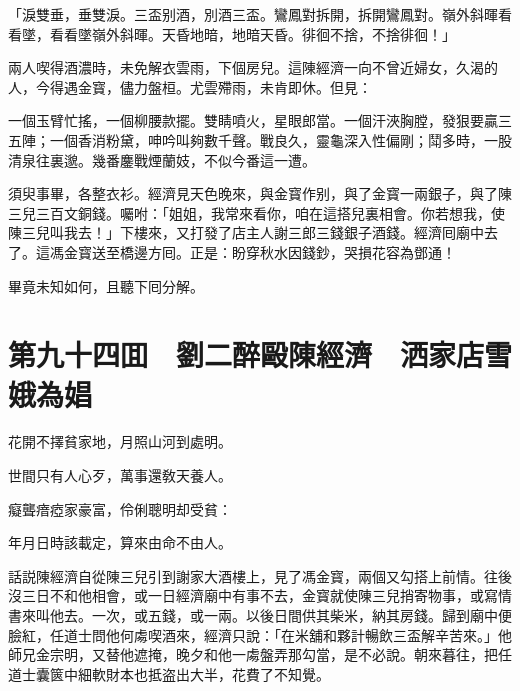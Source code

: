 「淚雙垂，垂雙淚。三盃别酒，別酒三盃。鸞鳳對拆開，拆開鸞鳳對。嶺外斜暉看看墜，看看墜嶺外斜暉。天昏地暗，地暗天昏。徘徊不捨，不捨徘徊！」

兩人喫得酒濃時，未免解衣雲雨，下個房兒。這陳經濟一向不曾近婦女，久渴的人，今得遇金寳，儘力盤桓。尤雲殢雨，未肯即休。但見：

一個玉臂忙搖，一個柳腰款擺。雙睛噴火，星眼郎當。一個汗浹胸膛，發狠要贏三五陣；一個香消粉黛，呻吟叫夠數千聲。戰良久，靈龜深入性偏剛；鬦多時，一股清泉往裏邈。幾番鏖戰煙蘭妓，不似今番這一遭。

須臾事畢，各整衣衫。經濟見天色晚來，與金寳作别，與了金寳一兩銀子，與了陳三兒三百文銅錢。囑咐：「姐姐，我常來看你，咱在這搭兒裏相會。你若想我，使陳三兒叫我去！」下樓來，又打發了店主人謝三郎三錢銀子酒錢。經濟囘廟中去了。這馮金寳送至橋邊方囘。正是：盼穿秋水因錢鈔，哭損花容為鄧通！

畢竟未知如何，且聽下囘分解。

\chapter*{第九十四囬　劉二醉毆陳經濟　洒家店雪娥為娼}

花開不擇貧家地，月照山河到處明。

世間只有人心歹，萬事還敎天養人。

癡聾瘖瘂家豪富，伶俐聰明却受貧：

年月日時該載定，算來由命不由人。

話説陳經濟自從陳三兒引到謝家大酒樓上，見了馮金寳，兩個又勾搭上前情。往後沒三日不和他相會，或一日經濟廟中有事不去，金寳就使陳三兒捎寄物事，或寫情書來叫他去。一次，或五錢，或一兩。以後日間供其柴米，納其房錢。歸到廟中便臉紅，任道士問他何䖏喫酒來，經濟只說：「在米舖和夥計暢飲三盃解辛苦來。」他師兄金宗明，又替他遮掩，晚夕和他一䖏盤弄那勾當，是不必說。朝來暮往，把任道士囊篋中細軟財本也抵盗出大半，花費了不知覺。

